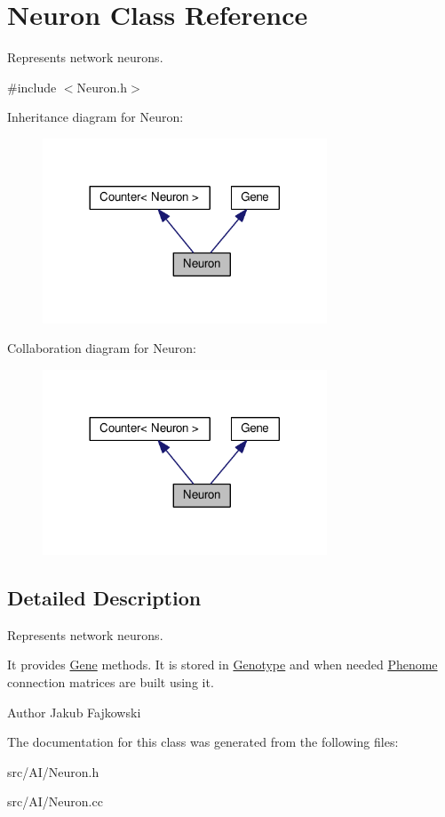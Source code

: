 \hypertarget{classNeuron}{}\section{Neuron Class Reference}
\label{classNeuron}


Represents network neurons.  




{\ttfamily \#include $<$Neuron.\+h$>$}



Inheritance diagram for Neuron\+:\nopagebreak
\begin{figure}[H]
\begin{center}
\leavevmode
\includegraphics[width=240pt]{classNeuron__inherit__graph}
\end{center}
\end{figure}


Collaboration diagram for Neuron\+:\nopagebreak
\begin{figure}[H]
\begin{center}
\leavevmode
\includegraphics[width=240pt]{classNeuron__coll__graph}
\end{center}
\end{figure}


\subsection{Detailed Description}
Represents network neurons. 

It provides \hyperlink{classGene}{Gene} methods. It is stored in \hyperlink{classGenotype}{Genotype} and when needed \hyperlink{classPhenome}{Phenome} connection matrices are built using it. \begin{DoxyAuthor}{Author}
Jakub Fajkowski 
\end{DoxyAuthor}


The documentation for this class was generated from the following files\+:\begin{DoxyCompactItemize}
\item 
src/\+A\+I/Neuron.\+h\item 
src/\+A\+I/Neuron.\+cc\end{DoxyCompactItemize}
